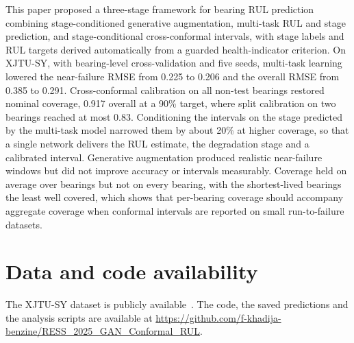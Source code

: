 \documentclass[review]{elsarticle}
\begin{document}
This paper proposed a three-stage framework for bearing RUL prediction
combining stage-conditioned generative augmentation, multi-task RUL and
stage prediction, and stage-conditional cross-conformal intervals, with
stage labels and RUL targets derived automatically from a guarded
health-indicator criterion. On XJTU-SY, with bearing-level
cross-validation and five seeds, multi-task learning lowered the
near-failure RMSE from 0.225 to 0.206 and the overall RMSE from 0.385
to 0.291. Cross-conformal calibration on all non-test bearings restored
nominal coverage, 0.917 overall at a 90\% target, where split
calibration on two bearings reached at most 0.83. Conditioning the
intervals on the stage predicted by the multi-task model narrowed them
by about 20\% at higher coverage, so that a single network delivers the
RUL estimate, the degradation stage and a calibrated interval.
Generative augmentation produced realistic near-failure windows but did
not improve accuracy or intervals measurably. Coverage held on average
over bearings but not on every bearing, with the shortest-lived
bearings the least well covered, which shows that per-bearing coverage
should accompany aggregate coverage when conformal intervals are
reported on small run-to-failure datasets.


\section*{Data and code availability}
The XJTU-SY dataset is publicly available~\cite{lei2019xjtusy}. The code,
the saved predictions and the analysis scripts are available at
\url{https://github.com/f-khadija-benzine/RESS_2025_GAN_Conformal_RUL}.



\end{document}
